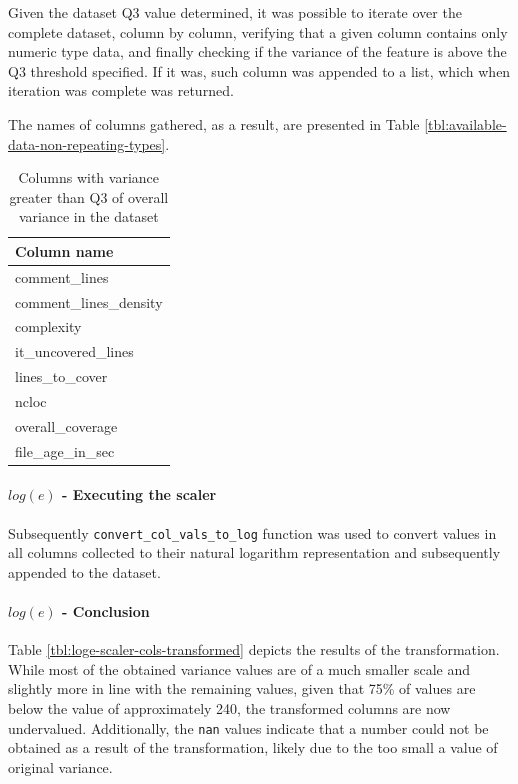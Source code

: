 Given the dataset Q3 value determined, it was possible to iterate over the complete dataset, column by column, verifying that a given column contains only numeric type data, and finally checking if the variance of the feature is above the Q3 threshold specified. If it was, such column was appended to a list, which when iteration was complete was returned. 

The names of columns gathered, as a result, are presented in Table \ref{tbl:available-data-non-repeating-types}.

\begin{table}[!h]
\centering
\caption{Columns with variance greater than Q3 of overall variance in the dataset}
\label{tab:loge-scaler-cols-aboveq3}
\begin{tabular}{@{}l@{}}
\toprule
Column name \\ \midrule
comment\_lines \\
comment\_lines\_density \\
complexity \\
it\_uncovered\_lines \\
lines\_to\_cover \\
ncloc \\
overall\_coverage \\
file\_age\_in\_sec \\ \bottomrule
\end{tabular}
\end{table}

\paragraph{$log(e)$ - Executing the scaler}
Subsequently \texttt{convert\_col\_vals\_to\_log} function was used to convert values in all columns collected to their natural logarithm representation and subsequently appended to the dataset.

\paragraph{$log(e)$ - Conclusion}
Table \ref{tbl:loge-scaler-cols-transformed} depicts the results of the transformation. While most of the obtained variance values are of a much smaller scale and slightly more in line with the remaining values, given that 75\% of values are below the value of approximately 240, the transformed columns are now undervalued. 
Additionally, the \texttt{nan} values indicate that a number could not be obtained as a result of the transformation, likely due to the too small a value of original variance. 

